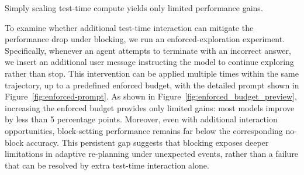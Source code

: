 \documentclass{llmxive}
\begin{document}
\begin{takeaway}[label={tak:analysis-test-time-tricks}]
Simply scaling test-time compute yields only limited performance gains.
\label{sec:enforce-analysis}
\end{takeaway}

\noindent To examine whether additional test-time interaction can mitigate the performance drop under blocking, we run an enforced-exploration experiment.
Specifically, whenever an agent attempts to terminate with an incorrect answer, we insert an additional user message instructing the model to continue exploring rather than stop.
This intervention can be applied multiple times within the same trajectory, up to a predefined enforced budget, with the detailed prompt shown in Figure~\ref{fig:enforced-prompt}.
As shown in Figure~\ref{fig:enforced_budget_preview}, increasing the enforced budget provides only limited gains: most models improve by less than 5 percentage points.
Moreover, even with additional interaction opportunities, block-setting performance remains far below the corresponding no-block accuracy.
This persistent gap suggests that blocking exposes deeper limitations in adaptive re-planning under unexpected events, rather than a failure that can be resolved by extra test-time interaction alone.

\end{document}
